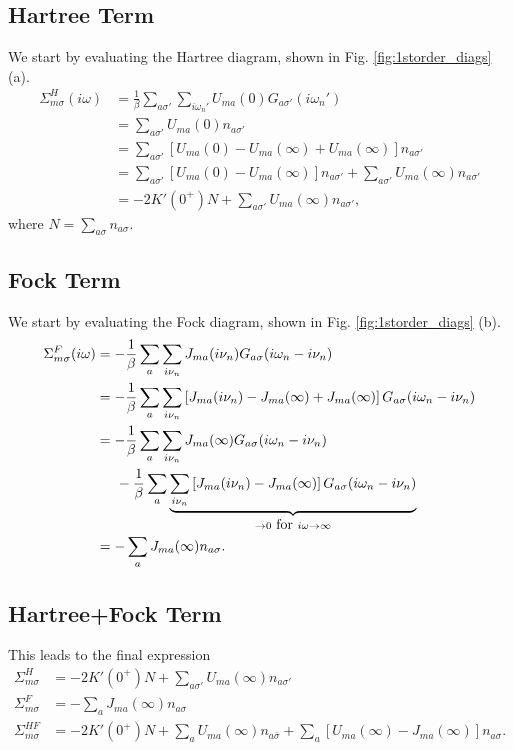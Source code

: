 \documentclass[12pt,a4paper]{scrartcl}
\numberwithin{equation}{section}
\begin{document}
\subsection{Hartree Term}
We start by evaluating the Hartree diagram, shown in Fig. \ref{fig:1storder_diags} (a).
\begin{align}
\Sigma^{H}_{m\sigma}(i\omega)
&= \frac{1}{\beta} \sum_{a\sigma'}\sum_{i\omega_n'} U_{ma}(0) G_{a\sigma'}(i\omega_n') \\
&= \sum_{a\sigma'} U_{ma}(0) n_{a\sigma'} \\
&= \sum_{a\sigma'} \left[ U_{ma}(0) - U_{ma}(\infty) + U_{ma}(\infty) \right] n_{a\sigma'} \\
&= \sum_{a\sigma'} \left[ U_{ma}(0) - U_{ma}(\infty) \right] n_{a\sigma'} + \sum_{a\sigma'} U_{ma}(\infty)n_{a\sigma'} \\
&= -2K'(0^+)N + \sum_{a\sigma'} U_{ma}(\infty)n_{a\sigma'},
\end{align}
where $N=\sum_{a\sigma}n_{a\sigma}$.

\subsection{Fock Term}
We start by evaluating the Fock diagram, shown in Fig. \ref{fig:1storder_diags} (b).
\begin{align}
\Sigma^{F}_{m\sigma}(i\omega)
&= -\frac{1}{\beta} \sum_a \sum_{i\nu_n} J_{ma}(i\nu_n) G_{a\sigma}(i\omega_n-i\nu_n) \\
&= -\frac{1}{\beta} \sum_a\sum_{i\nu_n} \left[ J_{ma}(i\nu_n) - J_{ma}(\infty)+J_{ma}(\infty) \right] G_{a\sigma}(i\omega_n-i\nu_n) \\
%
&= -\frac{1}{\beta}\sum_a \sum_{i\nu_n} J_{ma}(\infty)G_{a\sigma}(i\omega_n-i\nu_n) \nonumber \\
& \hspace{0.5cm}  -\frac{1}{\beta} \sum_a \underbrace{\sum_{i\nu_n} \left[ J_{ma}(i\nu_n) - J_{ma}(\infty)\right] G_{a\sigma}(i\omega_n-i\nu_n)}_{\rightarrow 0 \mbox{ for }i\omega\rightarrow \infty} \\ 
%
&= - \sum_aJ_{ma}(\infty)n_{a\sigma}.
\end{align}

\subsection{Hartree+Fock Term}
This leads to the final expression
\begin{align}
\Sigma^{H}_{m\sigma}
&= -2K'(0^+)N + \sum_{a\sigma'} U_{ma}(\infty)n_{a\sigma'} \\
%
\Sigma^{F}_{m\sigma}
&= - \sum_aJ_{ma}(\infty)n_{a\sigma} \\
%
\Sigma^{HF}_{m\sigma}
&= -2K'(0^+)N + \sum_{a} U_{ma}(\infty)n_{a\bar{\sigma}} 
             + \sum_{a} [U_{ma}(\infty)-J_{ma}(\infty)]n_{a\sigma} .
\end{align}
\end{document}
